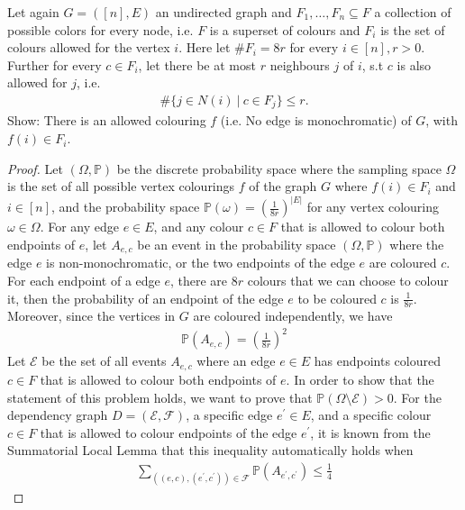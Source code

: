 \begin{problem}
  Let again $G=([n],E)$ an undirected graph and $F_{1}, \ldots, F_{n} \subseteq F$ a collection of possible colors for every node, i.e. $F$ is a superset of colours and $F_{i}$ is the set of colours allowed for the vertex $i$. Here let $\# F_{i}=8r$ for every $i \in [n], r > 0$. Further for every $c \in F_{i}$, let there be at most $r$ neighbours $j$ of $i$, s.t $c$ is also allowed for $j$, i.e.
  \begin{align*}
    \# \{j \in N(i) \ | \ c \in F_{j}\} \leq r.
  \end{align*}
  Show: There is an allowed colouring $f$ (i.e. No edge is monochromatic) of $G$, with $f(i) \in F_{i}$.
\end{problem}
\begin{proof}
  Let $(\Omega, \mathbb{P})$ be the discrete probability space where the sampling space $\Omega$ is the set of all possible vertex colourings $f$ of the graph $G$ where $f(i) \in F_{i}$ and $i \in [n]$, and the probability space $\mathbb{P}(\omega) = \left( \frac{1}{8r} \right)^{|E|}$ for any vertex colouring $\omega \in \Omega$. For any edge $e \in E$, and any colour $c \in F$ that is allowed to colour both endpoints of $e$, let $A_{e,c}$ be an event in the probability space $(\Omega, \mathbb{P})$ where the edge $e$ is non-monochromatic, or the two endpoints of the edge $e$ are coloured $c$. For each endpoint of a edge $e$, there are $8r$ colours that we can choose to colour it, then the probability of an endpoint of the edge $e$ to be coloured $c$ is $\frac{1}{8r}$. Moreover, since the vertices in $G$ are coloured independently, we have
  \begin{align*}
    \mathbb{P}(A_{e,c}) = \left( \frac{1}{8r} \right)^{2} \tag{1.1}
  \end{align*}
  Let $\mathcal{E}$ be the set of all events $A_{e,c}$ where an edge $e \in E$ has endpoints coloured $c \in F$ that is allowed to colour both endpoints of $e$. In order to show that the statement of this problem holds, we want to prove that $\mathbb{P}(\Omega \setminus \mathcal{E}) > 0$. For the dependency graph $D=(\mathcal{E}, \mathcal{F})$, a specific edge $e^{'} \in E$, and a specific colour $c \in F$ that is allowed to colour endpoints of the edge $e^{'}$, it is known from the Summatorial Local Lemma that this inequality automatically holds when 
  \begin{align*}
    \sum_{\left( (e,c), (e^{'}, c^{'}) \right) \in \mathcal{F}} \mathbb{P}(A_{e^{'}, c^{'}}) \leq \frac{1}{4} \tag{1.2}
  \end{align*}

\end{proof}
